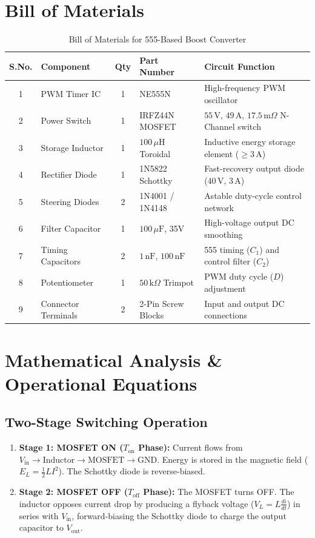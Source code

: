 \documentclass[11pt,a4paper]{article}
\begin{document}
\section{Bill of Materials}
\begin{table}[h!]
\centering
\caption{Bill of Materials for 555-Based Boost Converter}
\vspace{0.5em}
\begin{tabular}{@{}c l c l p{6cm}@{}}
\toprule
\textbf{S.No.} & \textbf{Component} & \textbf{Qty} & \textbf{Part Number} & \textbf{Circuit Function} \\
\midrule
1 & PWM Timer IC & 1 & NE555N & High-frequency PWM oscillator \\
2 & Power Switch & 1 & IRFZ44N MOSFET & $55\,\text{V}$, $49\,\text{A}$, $17.5\,\text{m}\Omega$ N-Channel switch \\
3 & Storage Inductor & 1 & $100\,\mu\text{H}$ Toroidal & Inductive energy storage element ($\ge 3\,\text{A}$) \\
4 & Rectifier Diode & 1 & 1N5822 Schottky & Fast-recovery output diode ($40\,\text{V}$, $3\,\text{A}$) \\
5 & Steering Diodes & 2 & 1N4001 / 1N4148 & Astable duty-cycle control network \\
6 & Filter Capacitor & 1 & $100\,\mu\text{F}$, 35V & High-voltage output DC smoothing \\
7 & Timing Capacitors & 2 & $1\,\text{nF}$, $100\,\text{nF}$ & 555 timing ($C_1$) and control filter ($C_2$) \\
8 & Potentiometer & 1 & $50\,\text{k}\Omega$ Trimpot & PWM duty cycle ($D$) adjustment \\
9 & Connector Terminals & 2 & 2-Pin Screw Blocks & Input and output DC connections \\
\bottomrule
\end{tabular}
\end{table}

\section{Mathematical Analysis \& Operational Equations}

\subsection{Two-Stage Switching Operation}
\begin{enumerate}
    \item \textbf{Stage 1: MOSFET ON ($T_{\text{on}}$ Phase):}
    Current flows from $V_{\text{in}} \rightarrow \text{Inductor} \rightarrow \text{MOSFET} \rightarrow \text{GND}$. Energy is stored in the magnetic field ($E_L = \frac{1}{2}L I^2$). The Schottky diode is reverse-biased.
    \item \textbf{Stage 2: MOSFET OFF ($T_{\text{off}}$ Phase):}
    The MOSFET turns OFF. The inductor opposes current drop by producing a flyback voltage ($V_L = L \frac{di}{dt}$) in series with $V_{\text{in}}$, forward-biasing the Schottky diode to charge the output capacitor to $V_{\text{out}}$.
\end{enumerate}
\end{document}
